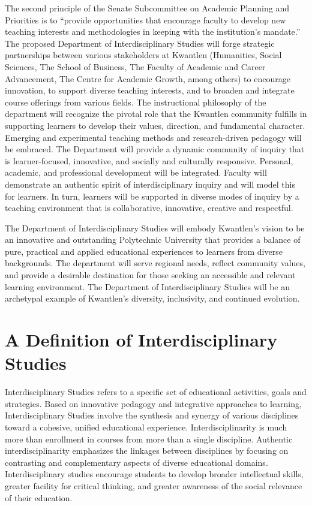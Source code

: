 \documentclass[12pt,DIV11,letterpaper,oneside,abstractoff,headsepline]{scrreprt}
\begin{document}
The second principle of the Senate Subcommittee on Academic Planning and Priorities is to ``provide opportunities that encourage faculty to develop new teaching interests and methodologies in keeping with the institution’s mandate.'' The proposed Department of Interdisciplinary Studies will forge strategic partnerships between various stakeholders at Kwantlen (Humanities, Social Sciences, The School of Business, The Faculty of Academic and Career Advancement, The Centre for Academic Growth, among others) to encourage innovation, to support diverse teaching interests, and to broaden and integrate course offerings from various fields. The instructional philosophy of the department will recognize the pivotal role that the Kwantlen community fulfills in supporting learners to develop their values, direction, and fundamental character. Emerging and experimental teaching methods and research-driven pedagogy will be embraced. The Department will provide a dynamic community of inquiry that is learner-focused, innovative, and socially and culturally responsive. Personal, academic, and professional development will be integrated. Faculty will demonstrate an authentic spirit of interdisciplinary inquiry and will model this for learners. In turn, learners will be supported in diverse modes of inquiry by a teaching environment that is collaborative, innovative, creative and respectful.

The Department of Interdisciplinary Studies will embody Kwantlen’s vision to be an innovative and outstanding Polytechnic University that provides a balance of pure, practical and applied educational experiences to learners from diverse backgrounds. The department will serve regional needs, reflect community values, and provide a desirable destination for those seeking an accessible and relevant learning environment. The Department of Interdisciplinary Studies will be an archetypal example of Kwantlen’s diversity, inclusivity, and continued evolution.
\newpage

\section{A Definition of Interdisciplinary Studies}
\label{sec-4}

Interdisciplinary Studies refers to a specific set of educational activities, goals and strategies. Based on innovative pedagogy and integrative approaches to learning, Interdisciplinary Studies involve the synthesis and synergy of various disciplines toward a cohesive, unified educational experience. Interdisciplinarity is much more than enrollment in courses from more than a single discipline. Authentic interdisciplinarity emphasizes the linkages between disciplines by focusing on contrasting and complementary aspects of diverse educational domains. Interdisciplinary studies encourage students to develop broader intellectual skills, greater facility for critical thinking, and greater awareness of the social relevance of their education. 
\end{document}
